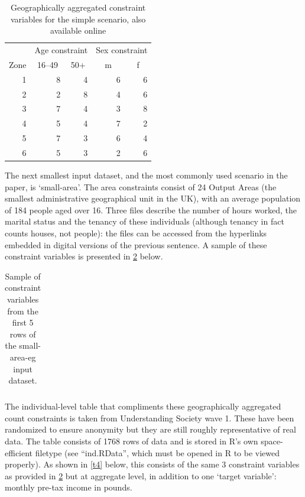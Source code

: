 \documentclass[a4paper,10pt]{article}
\begin{document}
\begin{table}[htbp]
\caption{Geographically aggregated constraint variables for the simple scenario, also available online}
\begin{center}
\begin{tabular}{rrrrr}
\toprule
\multicolumn{1}{l}{} & \multicolumn{2}{c}{Age constraint} & \multicolumn{2}{c}{Sex constraint} \\
\multicolumn{1}{l}{Zone} & \multicolumn{1}{c}{16--49} & \multicolumn{1}{c}{50+} & \multicolumn{1}{c}{m} & \multicolumn{1}{c}{f} \\
\midrule
1 & 8 & 4 & 6 & 6 \\
2 & 2 & 8 & 4 & 6 \\
3 & 7 & 4 & 3 & 8 \\
4 & 5 & 4 & 7 & 2 \\
5 & 7 & 3 & 6 & 4 \\
6 & 5 & 3 & 2 & 6 \\
\bottomrule
\end{tabular}
\end{center}
\label{t2}
\end{table}

The next smallest input dataset, and the most commonly used scenario in the paper, 
is `small-area'. The area constraints consist of 24 Output Areas (the smallest 
administrative geographical unit in the UK), with an average population of 184 people aged over 16. 
Three files describe the number of hours worked, the marital status and the tenancy of these 
individuals (although tenancy in fact counts houses, not people): the files can be accessed 
from the hyperlinks embedded in digital versions of the previous sentence. 
A sample of these constraint variables is presented in \cref{t3} below. %

\begin{table}[htbp]
\caption{Sample of constraint variables from the first 5 rows of the small-area-eg input dataset.}
\begin{center}
\begin{tabular}{rrrrr}
\toprule
\bottomrule
\end{tabular}
\end{center}
\label{t3}
\end{table}

The individual-level table that compliments these geographically aggregated count constraints 
is taken from Understanding Society wave 1. These have been randomized to ensure anonymity
but they are still roughly representative of real data. The table consists of 1768 rows of 
data and is stored in R’s own space-efficient filetype (see ``ind.RData'', which must be opened in 
R to be viewed properly). As shown in \cref{t4} below, this consists of the same 3 
constraint variables as provided in \cref{t3} but at aggregate level, in addition to one 
`target variable': monthly pre-tax income in pounds. 
\end{document}
